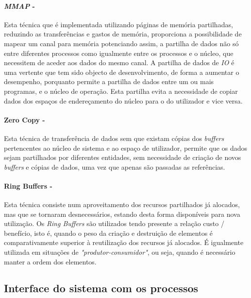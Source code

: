 \paragraph*{\textit{MMAP} - }

Esta técnica que é implementada utilizando páginas de memória partilhadas, reduzindo as transferências e gastos de memória, proporciona a possibilidade de mapear um canal para memória potenciando assim, a partilha de dados não só entre diferentes processos como igualmente entre os processos e o núcleo, que necessitem de aceder aos dados do mesmo canal.
A partilha de dados de \textit{IO} é uma vertente que tem sido objecto de desenvolvimento, de forma a aumentar o desempenho, porquanto permite a partilha de dados entre um ou mais programas, e o núcleo de operação.
Esta partilha evita a necessidade de copiar dados dos espaços de endereçamento do núcleo para o do utilizador e vice versa.

\paragraph*{Zero Copy - }

Esta técnica de transferência de dados sem que existam cópias dos \textit{buffers} pertencentes ao núcleo de sistema e ao espaço de utilizador, permite que os dados sejam partilhados por diferentes entidades, sem necessidade de criação de novos \textit{buffers} e cópias de dados, uma vez que apenas são passadas as referências.

\paragraph*{Ring Buffers - }

Esta técnica consiste num aproveitamento dos recursos partilhados já alocados, mas que se tornaram desnecessários, estando desta forma disponíveis para nova utilização.
Os \textit{Ring Buffers} são utilizados tendo presente a relação custo / benefício, isto é, quando o peso da criação e destruição de elementos é comparativamente superior à reutilização dos recursos já alocados.
É igualmente utilizada em situações de \textit{"produtor-consumidor"}, ou seja, quando é necessário manter a ordem dos elementos.


\subsection{Interface do sistema com os processos}
% 

